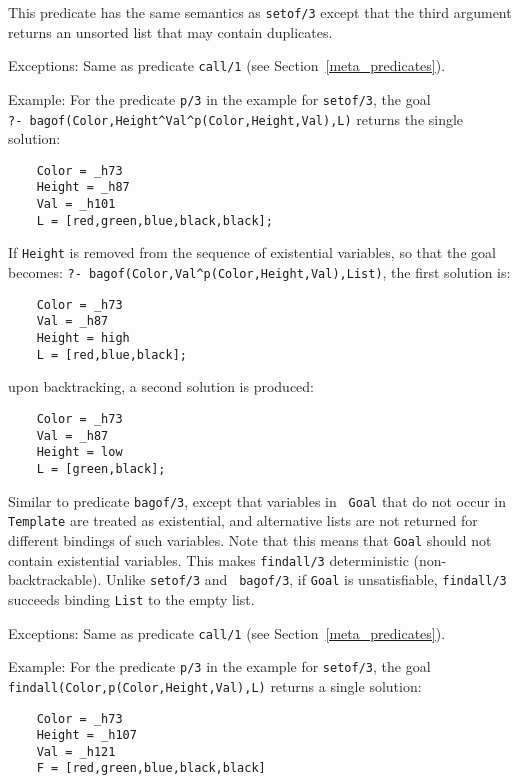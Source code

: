 \begin{description}
  This
predicate has the same semantics as {\tt setof/3} except that the
third argument returns an unsorted list that may contain duplicates.

Exceptions: Same as predicate {\tt call/1} (see
Section~\ref{meta_predicates}).

Example: 
%
For the predicate {\tt p/3} in the example for {\tt setof/3}, the
goal\\ 
\verb|?- bagof(Color,Height^Val^p(Color,Height,Val),L)| returns
the single solution:
\begin{verbatim}
    Color = _h73
    Height = _h87
    Val = _h101
    L = [red,green,blue,black,black];
\end{verbatim}
If {\tt Height} is removed from the sequence of existential variables, so
that the goal becomes: 
\verb|?- bagof(Color,Val^p(Color,Height,Val),List)|, the first solution is:
\begin{verbatim}
    Color = _h73
    Val = _h87
    Height = high
    L = [red,blue,black];
\end{verbatim}
%
upon backtracking, a second solution is produced: 
%
\begin{verbatim}
    Color = _h73
    Val = _h87
    Height = low
    L = [green,black];
\end{verbatim}


 
Similar to predicate {\tt bagof/3}, except that variables in {\tt
  Goal} that do not occur in {\tt Template} are treated as
existential, and alternative lists are not returned for different
bindings of such variables.  Note that this means that {\tt Goal}
should not contain existential variables.  This makes {\tt findall/3}
deterministic (non-backtrackable).  Unlike {\tt setof/3} and {\tt
  bagof/3}, if {\tt Goal} is unsatisfiable, {\tt findall/3} succeeds
binding {\tt List} to the empty list.

    Exceptions: Same as predicate {\tt call/1}
		(see Section~\ref{meta_predicates}).

Example: 
%
For the predicate {\tt p/3} in the example for {\tt setof/3}, the goal \\
{\tt findall(Color,p(Color,Height,Val),L)} returns a single solution: 
%
\begin{verbatim}
    Color = _h73
    Height = _h107
    Val = _h121
    F = [red,green,blue,black,black]
\end{verbatim}


\end{description}
